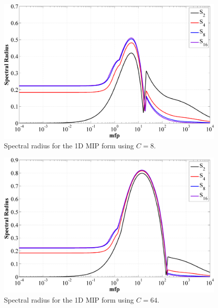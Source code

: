 \begin{figure}
\label{fig::1D_MIP_c=8}
\centering
\includegraphics[width=\textwidth]{figures/appendices/DSA_1D_SI_MIP_C=8.png}
\caption{Spectral radius for the 1D MIP form using $C=8$.}
\end{figure}

\begin{figure}
\label{fig::1D_MIP_c=64}
\centering
\includegraphics[width=\textwidth]{figures/appendices/DSA_1D_SI_MIP_C=64.png}
\caption{Spectral radius for the 1D MIP form using $C=64$.}
\end{figure}

